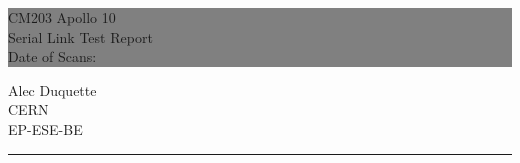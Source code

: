 \documentclass{report}
\begin{document}

\begin{titlepage} %
  
  
  \colorbox{grey}{
    \parbox[t]{0.93\textwidth}{ %
      \parbox[t]{0.91\textwidth}{ %
        \raggedleft %
        \fontsize{80pt}{40pt}\selectfont %
        \vspace{0.7cm} %

        CM203 Apollo 10\\
        Serial Link Test Report\\
        Date of Scans: \dateofscans\\
        
        \vspace{0.7cm} %
        }
      }
    }
  
  \vfill %
  
  
  \parbox[t]{0.93\textwidth}{ %
    \raggedleft %
    \large %
    {\Large Alec Duquette}\\[4pt] %
    CERN\\
    EP-ESE-BE\\[4pt] %
    
    \hfill\rule{0.2\linewidth}{1pt}%
    }
  
\end{titlepage}

\hypertarget{MyToc}{}  %
\tableofcontents
\newpage
\end{document}
